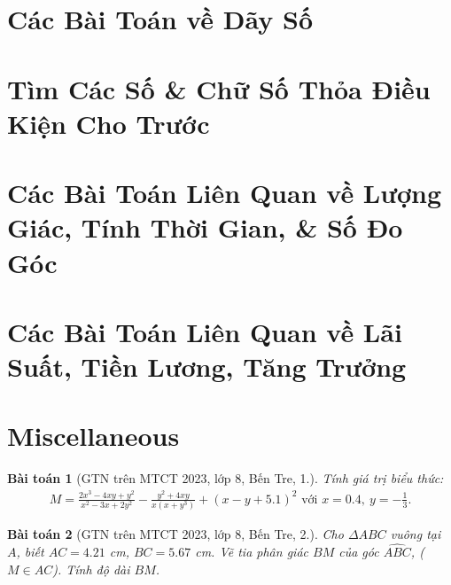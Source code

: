 \documentclass{article}
\newtheorem{baitoan}{Bài toán}
\begin{document}

\section{Các Bài Toán về Dãy Số}


\section{Tìm Các Số \& Chữ Số Thỏa Điều Kiện Cho Trước}


\section{Các Bài Toán Liên Quan về Lượng Giác, Tính Thời Gian, \& Số Đo Góc}


\section{Các Bài Toán Liên Quan về Lãi Suất, Tiền Lương, Tăng Trưởng}


\section{Miscellaneous}

\begin{baitoan}[GTN trên MTCT 2023, lớp 8, Bến Tre, 1.]
	Tính giá trị biểu thức:
	\begin{align*}
		M = \frac{2x^3 - 4xy + y^2}{x^2 - 3x + 2y^2} - \frac{y^2 + 4xy}{x(x + y^3)} + (x - y + 5.1)^2\mbox{ với } x = 0.4,\ y = -\frac{1}{3}.
	\end{align*}
\end{baitoan}

\begin{baitoan}[GTN trên MTCT 2023, lớp 8, Bến Tre, 2.]
	Cho $\Delta ABC$ vuông tại $A$, biết $AC = 4.21$ \emph{cm}, $BC = 5.67$ \emph{cm}. Vẽ tia phân giác $BM$ của góc $\widehat{ABC}$, ($M\in AC$). Tính độ dài $BM$.
\end{baitoan}
\end{document}
